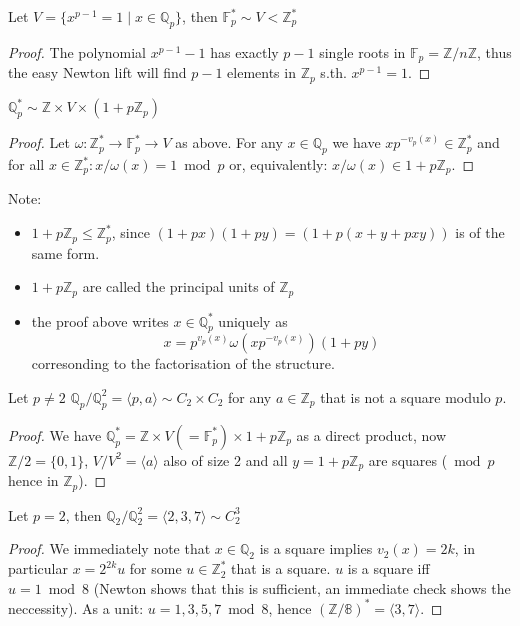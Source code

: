 \begin{theorem}
  Let $V = \{x^{p-1} = 1\mid x\in \mathbb Q_p\}$, then $\mathbb F_p^*\sim V<\mathbb Z_p^*$
\end{theorem}
\begin{proof}
  The polynomial $x^{p-1}-1$ has exactly $p-1$ single roots in $\mathbb F_p = \mathbb Z/n\mathbb Z$, thus the easy Newton lift will find $p-1$ elements
  in $\mathbb Z_p$ s.th. $x^{p-1} = 1$.
\end{proof}

\begin{korollar}
  $\mathbb Q_p^*\sim \mathbb Z \times V \times (1+p\mathbb Z_p)$
\end{korollar}
\begin{proof}
  Let $\omega: \mathbb Z_p^* \to \mathbb F_p^* \to V$ as above.
  For any $x\in\mathbb Q_p$ we have $xp^{-v_p(x)}\in\mathbb Z_p^*$ and
  for all $x\in \mathbb Z_p^*: x/\omega(x) = 1 \bmod p$ or,
  equivalently: $x/\omega(x)\in 1 + p\mathbb Z_p$.
\end{proof}
Note:
\begin{itemize}
  \item $1+p\mathbb Z_p \le \mathbb Z_p^*$, since
    $(1+px)(1+py) = (1+p(x+y + pxy))$ is of the same form.
  \item $1+p\mathbb Z_p$ are called the principal units of $\mathbb Z_p$
  \item the proof above writes $x\in\mathbb Q_p^*$ uniquely as
    $$x = p^{v_p(x)} \omega(x p^{-v_p(x)}) (1+py)$$
    corresonding to the factorisation of the structure.
\end{itemize}

\begin{korollar}
  Let $p\ne 2$ $\mathbb Q_p/\mathbb Q_p^2 = \langle p, a\rangle \sim C_2\times C_2$ for
  any $a\in \mathbb Z_p$ that is not a square modulo $p$.
\end{korollar}
\begin{proof}
  We have $\mathbb Q_p^* = \mathbb Z \times V(=\mathbb F_p^*) \times 1+p\mathbb Z_p$ as a direct product, now
  $\mathbb Z/2 = \{0, 1\}$, $V/V^2 = \langle a\rangle$ also of size 2 and
  all $y=1+p\mathbb Z_p$ are squares ($\bmod p$ hence in $\mathbb Z_p$).
\end{proof}

\begin{korollar}
  Let $p=2$, then $\mathbb Q_2/\mathbb Q_2^2 = \langle 2, 3, 7\rangle \sim C_2^3$
\end{korollar}
\begin{proof}
  We immediately note that $x\in\mathbb Q_2$ is a square implies $v_2(x) = 2k$,
  in particular $x = 2^{2k} u$ for some $u\in \mathbb Z_2^*$ that is a square.
  $u$ is a square iff $u=1\bmod 8$ (Newton shows
  that this is sufficient, an immediate check shows the neccessity).
  As a unit: $u = 1, 3, 5, 7\bmod 8$, hence
  $(\mathbb Z/\mathbb 8)^* = \langle 3, 7\rangle$.
\end{proof}

